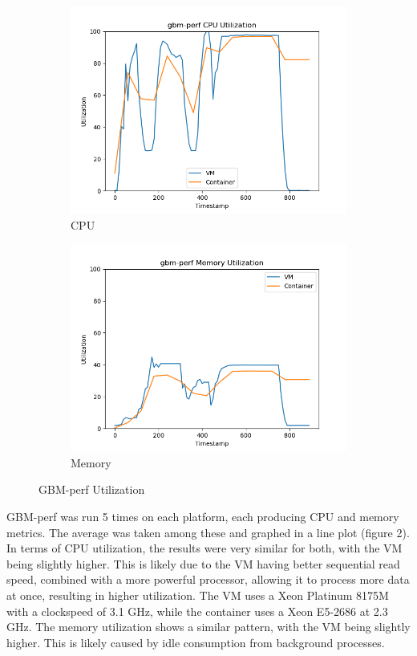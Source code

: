 \documentclass[11pt]{article}
\begin{document}
\begin{figure}[hbt!]
\centering
\begin{subfigure}{.5\textwidth}
  \centering
  \includegraphics[width=1.1\linewidth]{gbmperf_cpu_util.png}
  \caption{CPU}
  \label{fig:gbmperfu1}
\end{subfigure}%
\begin{subfigure}{.5\textwidth}
  \centering
  \includegraphics[width=1.1\linewidth]{gbmperf_mem_util.png}
  \caption{Memory}
  \label{fig:gbmperfu2}
\end{subfigure}
\caption{GBM-perf Utilization}
\label{fig:gbmperfutilizations}
\end{figure}

GBM-perf was run 5 times on each platform, each producing CPU and memory metrics. The average was taken among these and graphed in a line plot (figure 2). In terms of CPU utilization, the results were very similar for both, with the VM being slightly higher. This is likely due to the VM having better sequential read speed, combined with a more powerful processor, allowing it to process more data at once, resulting in higher utilization. The VM uses a Xeon Platinum 8175M with a clockspeed of 3.1 GHz, while the container uses a Xeon E5-2686 at 2.3 GHz. The memory utilization shows a similar pattern, with the VM being slightly higher. This is likely caused by idle consumption from background processes.
\end{document}
